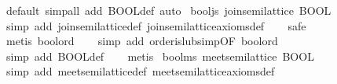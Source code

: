 \begin{isabellebody}
%
\isatagproof
{}\isamarkupfalse%
\ {}default{}\ simp{}all\ add{}\ BOOL{}def{}\ auto{}%
\endisatagproof
{\isafoldproof}%
%
\isadelimproof
\isanewline
%
\endisadelimproof
\isanewline
{}\isamarkupfalse%
\ bool{}js{}\ {}join{}semilattice\ BOOL{}\isanewline
%
\isadelimproof
\ \ %
\endisadelimproof
%
\isatagproof
{}\isamarkupfalse%
\ {}simp\ add{}\ join{}semilattice{}def\ join{}semilattice{}axioms{}def{}\isanewline
\ \ \isamarkupfalse%
\ safe\isanewline
\ \ \isamarkupfalse%
\ {}metis\ bool{}ord{}\isanewline
\ \ \isamarkupfalse%
\ {}simp\ add{}\ order{}is{}lub{}simp{}OF\ bool{}ord{}{}\isanewline
\ \ \isamarkupfalse%
\ {}simp\ add{}\ BOOL{}def{}\isanewline
\ \ \isamarkupfalse%
\ metis%
\endisatagproof
{\isafoldproof}%
%
\isadelimproof
\isanewline
%
\endisadelimproof
\isanewline
{}\isamarkupfalse%
\ bool{}ms{}\ {}meet{}semilattice\ BOOL{}\isanewline
%
\isadelimproof
\ \ %
\endisadelimproof
%
\isatagproof
{}\isamarkupfalse%
\ {}simp\ add{}\ meet{}semilattice{}def\ meet{}semilattice{}axioms{}def{}\isanewline

\end{isabellebody}
